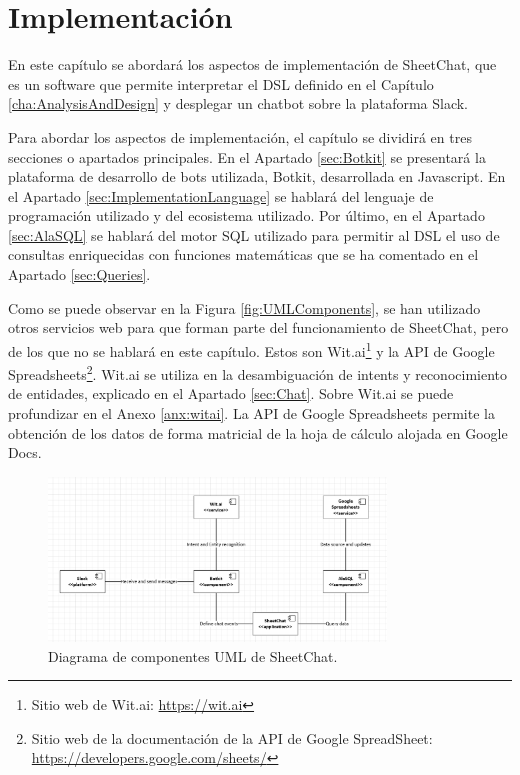 \chapter{Implementación}
\label{cha:Implementation}

En este capítulo se abordará los aspectos de implementación de SheetChat, que es un software que permite interpretar el DSL definido en el Capítulo \ref{cha:AnalysisAndDesign} y desplegar un chatbot sobre la plataforma Slack.

Para abordar los aspectos de implementación, el capítulo se dividirá en tres secciones o apartados principales. En el Apartado \ref{sec:Botkit} se presentará la plataforma de desarrollo de bots utilizada, Botkit, desarrollada en Javascript. En el Apartado \ref{sec:ImplementationLanguage} se hablará del lenguaje de programación utilizado y del ecosistema utilizado. Por último, en el Apartado \ref{sec:AlaSQL} se hablará del motor SQL utilizado para permitir al DSL el uso de consultas enriquecidas con funciones matemáticas que se ha comentado en el Apartado \ref{sec:Queries}.

Como se puede observar en la Figura \ref{fig:UMLComponents}, se han utilizado otros servicios web para que forman parte del funcionamiento de SheetChat, pero de los que no se hablará en este capítulo. Estos son Wit.ai\footnote{Sitio web de Wit.ai: \url{https://wit.ai}} y la API de Google Spreadsheets\footnote{Sitio web de la documentación de la API de Google SpreadSheet: \url{https://developers.google.com/sheets/}}. Wit.ai se utiliza en la desambiguación de intents y reconocimiento de entidades, explicado en el Apartado \ref{sec:Chat}. Sobre Wit.ai se puede profundizar en el Anexo \ref{anx:witai}. La API de Google Spreadsheets permite la obtención de los datos de forma matricial de la hoja de cálculo alojada en Google Docs.

\begin{figure}[htb]
	\centering
	\includegraphics[width=0.8\textwidth]{./figs/UMLComponents.png}
	\caption{Diagrama de componentes UML de SheetChat.}
	\label{fig:BotkitConversation}
\end{figure}

